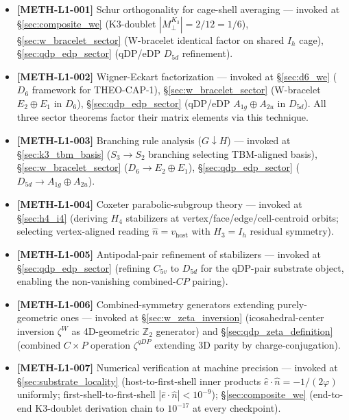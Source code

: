 \documentclass[11pt,letterpaper]{article}
\newcommand{\phig}{\varphi}
\newcommand{\Kthree}{\ensuremath{K_3}}
\newcommand{\Hfour}{H_4}
\begin{document}
\begin{itemize}\setlength\itemsep{0.15em}
    \item \textbf{[METH-L1-001]} Schur orthogonality for cage-shell averaging --- invoked at \S\ref{sec:composite_we} (K3-doublet $|M_\perp^{\Kthree}| = 2/12 = 1/6$), \S\ref{sec:w_bracelet_sector} (W-bracelet identical factor on shared $I_h$ cage), \S\ref{sec:qdp_edp_sector} (qDP/eDP $D_{5d}$ refinement).
    \item \textbf{[METH-L1-002]} Wigner-Eckart factorization --- invoked at \S\ref{sec:d6_we} ($D_6$ framework for THEO-CAP-1), \S\ref{sec:w_bracelet_sector} (W-bracelet $E_2 \oplus E_1$ in $D_6$), \S\ref{sec:qdp_edp_sector} (qDP/eDP $A_{1g} \oplus A_{2u}$ in $D_{5d}$). All three sector theorems factor their matrix elements via this technique.
    \item \textbf{[METH-L1-003]} Branching rule analysis ($G \downarrow H$) --- invoked at \S\ref{sec:k3_tbm_basis} ($S_3 \to S_2$ branching selecting TBM-aligned basis), \S\ref{sec:w_bracelet_sector} ($D_6 \to E_2 \oplus E_1$), \S\ref{sec:qdp_edp_sector} ($D_{5d} \to A_{1g} \oplus A_{2u}$).
    \item \textbf{[METH-L1-004]} Coxeter parabolic-subgroup theory --- invoked at \S\ref{sec:h4_i4} (deriving $\Hfour$ stabilizers at vertex/face/edge/cell-centroid orbits; selecting vertex-aligned reading $\hat{n} = v_{\text{host}}$ with $H_3 = I_h$ residual symmetry).
    \item \textbf{[METH-L1-005]} Antipodal-pair refinement of stabilizers --- invoked at \S\ref{sec:qdp_edp_sector} (refining $C_{5v}$ to $D_{5d}$ for the qDP-pair substrate object, enabling the non-vanishing combined-$CP$ pairing).
    \item \textbf{[METH-L1-006]} Combined-symmetry generators extending purely-geometric ones --- invoked at \S\ref{sec:w_zeta_inversion} (icosahedral-center inversion $\zeta^W$ as 4D-geometric $\mathbb{Z}_2$ generator) and \S\ref{sec:qdp_zeta_definition} (combined $C \times P$ operation $\zeta^{qDP}$ extending 3D parity by charge-conjugation).
    \item \textbf{[METH-L1-007]} Numerical verification at machine precision --- invoked at \S\ref{sec:substrate_locality} (host-to-first-shell inner products $\hat{e} \cdot \hat{n} = -1/(2\phig)$ uniformly; first-shell-to-first-shell $|\hat{e} \cdot \hat{n}| < 10^{-9}$); \S\ref{sec:composite_we} (end-to-end K3-doublet derivation chain to $10^{-17}$ at every checkpoint).
\end{itemize}
\end{document}
